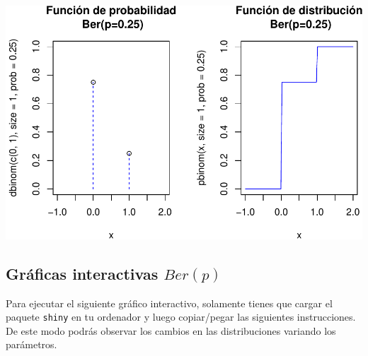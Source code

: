 \documentclass[]{book}
\begin{document}
\begin{center}\includegraphics{curso-probabilidad-udemy_files/figure-latex/unnamed-chunk-12-1} \end{center}

\hypertarget{gruxe1ficas-interactivas-berp}{%
\subsection{\texorpdfstring{Gráficas interactivas \(Ber(p)\)}{Gráficas interactivas Ber(p)}}\label{gruxe1ficas-interactivas-berp}}

Para ejecutar el siguiente gráfico interactivo, solamente tienes que cargar el paquete \texttt{shiny} en tu ordenador y luego copiar/pegar las siguientes instrucciones. De este modo podrás observar los cambios en las distribuciones variando los parámetros.
\end{document}
